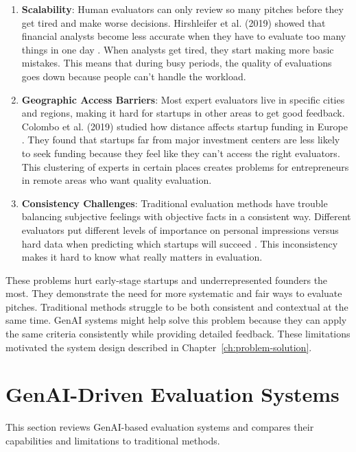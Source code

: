 \begin{enumerate}
    \item \textbf{Scalability}: Human evaluators can only review so many pitches before they get tired and make worse decisions. Hirshleifer et al. (2019) showed that financial analysts become less accurate when they have to evaluate too many things in one day \cite{Hirshleifer2019}. When analysts get tired, they start making more basic mistakes. This means that during busy periods, the quality of evaluations goes down because people can't handle the workload.

    \item \textbf{Geographic Access Barriers}: Most expert evaluators live in specific cities and regions, making it hard for startups in other areas to get good feedback. Colombo et al. (2019) studied how distance affects startup funding in Europe \cite{Colombo2019}. They found that startups far from major investment centers are less likely to seek funding because they feel like they can't access the right evaluators. This clustering of experts in certain places creates problems for entrepreneurs in remote areas who want quality evaluation.

    \item \textbf{Consistency Challenges}: Traditional evaluation methods have trouble balancing subjective feelings with objective facts in a consistent way. Different evaluators put different levels of importance on personal impressions versus hard data when predicting which startups will succeed \cite{Tsay2021VISUALSDI}. This inconsistency makes it hard to know what really matters in evaluation.
\end{enumerate}

These problems hurt early-stage startups and underrepresented founders the most. They demonstrate the need for more systematic and fair ways to evaluate pitches. Traditional methods struggle to be both consistent and contextual at the same time. GenAI systems might help solve this problem because they can apply the same criteria consistently while providing detailed feedback. These limitations motivated the system design described in Chapter~\ref{ch:problem-solution}.

\section{GenAI-Driven Evaluation Systems}
\label{sec:GenAI-systems}

This section reviews GenAI-based evaluation systems and compares their capabilities and limitations to traditional methods.

